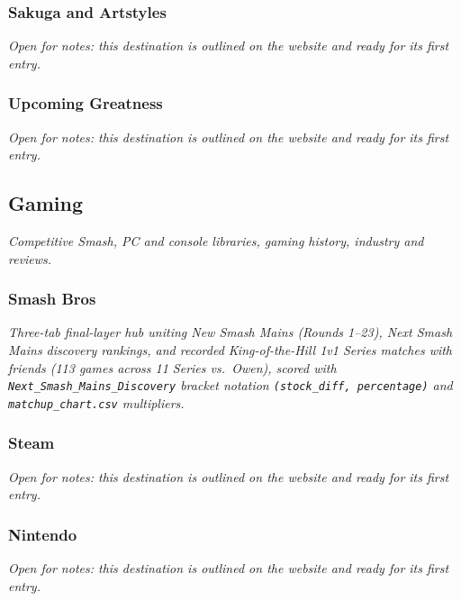 \documentclass{article}
\begin{document}
\subsubsection{Sakuga and Artstyles}\label{sec:sakuga-and-artstyles}
\textit{Open for notes: this destination is outlined on the website and ready for its first entry.}

\subsubsection{Upcoming Greatness}\label{sec:upcoming-greatness}
\textit{Open for notes: this destination is outlined on the website and ready for its first entry.}

\subsection{Gaming}\label{sec:gaming}
\textit{Competitive Smash, PC and console libraries, gaming history, industry and reviews.}

\subsubsection{Smash Bros}\label{sec:smash-bros}
\textit{Three-tab final-layer hub uniting New Smash Mains (Rounds 1--23), Next Smash Mains discovery rankings, and recorded King-of-the-Hill 1v1 Series matches with friends (113 games across 11 Series vs.\ Owen), scored with \texttt{Next\_Smash\_Mains\_Discovery} bracket notation \texttt{(stock\_diff, percentage)} and \texttt{matchup\_chart.csv} multipliers.}

\subsubsection{Steam}\label{sec:steam}
\textit{Open for notes: this destination is outlined on the website and ready for its first entry.}

\subsubsection{Nintendo}\label{sec:nintendo}
\textit{Open for notes: this destination is outlined on the website and ready for its first entry.}
\end{document}
